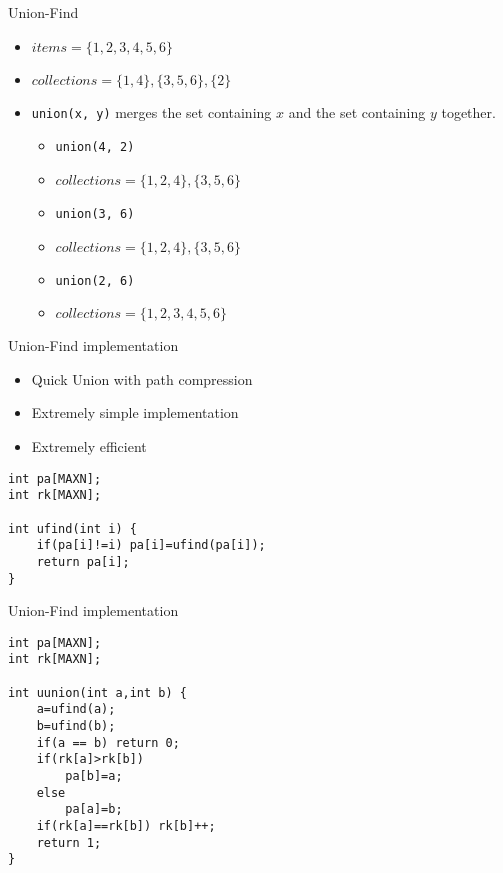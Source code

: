 \documentclass[12pt,t]{beamer}
\newcommand{\bi}{\begin{itemize}}
\newcommand{\ei}{\end{itemize}}
\begin{document}
\begin{frame}{Union-Find}
    \bi
        \vspace{10pt}
        \item $items = \{1,2,3,4,5,6\}$
        \item $collections = \{1,4\}, \{3,5,6\}, \{2\}$
        \vspace{10pt}
        \item \texttt{union(x, y)} merges the set containing $x$ and the set containing $y$ together.
        \vspace{10pt}
            \bi
                \item \texttt{union(4, 2)}
                \item $collections = \{1,2,4\}, \{3,5,6\}$
                \item \texttt{union(3, 6)}
                \item $collections = \{1,2,4\}, \{3,5,6\}$
                \item \texttt{union(2, 6)}
                \item $collections = \{1,2,3,4,5,6\}$
            \ei
    \ei
\end{frame}

\begin{frame}[fragile]{Union-Find implementation}
    \bi
        \item Quick Union with path compression
        \item Extremely simple implementation
        \item Extremely efficient
    \ei

    \vspace{10pt}

    \begin{verbatim}
int pa[MAXN];
int rk[MAXN];

int ufind(int i) {
    if(pa[i]!=i) pa[i]=ufind(pa[i]);
    return pa[i];
}
    \end{verbatim}
\end{frame}

\begin{frame}[fragile]{Union-Find implementation}

    \begin{verbatim}
int pa[MAXN];
int rk[MAXN];

int uunion(int a,int b) {
    a=ufind(a);
    b=ufind(b);
    if(a == b) return 0;
    if(rk[a]>rk[b])
        pa[b]=a;
    else
        pa[a]=b;
    if(rk[a]==rk[b]) rk[b]++;
    return 1;
}
    \end{verbatim}
\end{frame}
\end{document}
